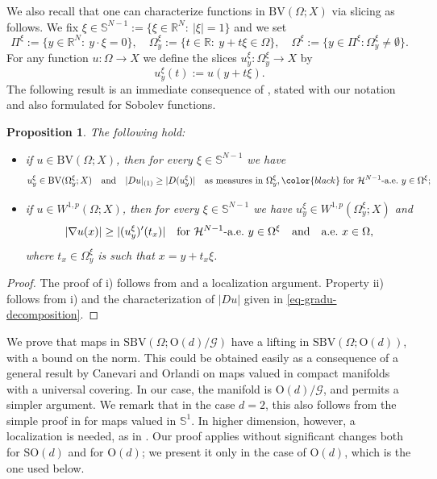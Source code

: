 \documentclass[a4paper,reqno]{amsart}
\newcommand\R{\mathbb{R}}
\newcommand{\BV}{\mathrm{BV}}
\newcommand{\SBV}{\mathrm{SBV}}
\newcommand\calH{\mathcal{H}}
\newtheorem{proposition}[definition]{Proposition}
\theoremstyle{remark}
\newcommand{\EEE}{\color{black}}
\newcommand{\G}{\mathcal{G}}
\newcommand{\SOn}{\mathrm{SO}(d)}
\newcommand{\On}{\mathrm{O}(d)}
\newcommand{\OnG}{{\On}/{\G}}
\newcommand{\xy}{^\xi_y}
\newcommand{\hN}{\calH^{N-1}}
\newcommand{\SN}{\mathbb{S}^{N-1}}
\numberwithin{equation}{section}
\begin{document}
We also recall that one can characterize functions in $\BV(\Omega;X)$ via slicing as follows.
We fix $\xi\in \SN:= \{ \xi\in\R^N\colon\ |\xi|=1\}$ and we set
\[
\Pi^\xi:=\{y\in\R^N\colon\ y\cdot \xi=0\}, \quad 
\Omega_y^\xi:=\{t\in\R\colon\ y+t\xi \in\Omega\}, \quad
\Omega^\xi:=\{y\in\Pi^\xi \colon \Omega_y^\xi \neq \emptyset\}.
\]
For any function $u\colon \Omega \to X$ we define  the slices $u_y^\xi\colon \Omega_y^\xi\to X$ by
$$
u_y^\xi(t):=u(y+t\xi).
$$
 The following result is an immediate consequence of \cite[Proposition 2.1]{Amb90SBVX}, stated with our notation and also formulated for Sobolev functions.


\begin{proposition}
	\label{prop-slicing}
The following hold:
	\begin{itemize}
		\item[i)] if $u\in \BV(\Omega;X)$, then for every $\xi\in \SN$ we have
\begin{equation}\label{3004251203}
		u_y^\xi\in \BV(\Omega_y^\xi; X)\quad \hbox{and} \quad 	|D u|_{(1)}\geq |D(u\xy)| \quad  \text{as measures in }\Omega\xy, \EEE \text{ for }\hN\text{-a.e.\ }y\in \Omega^\xi;
	\end{equation}
\item[ii)]	if $u\in W^{1,p}(\Omega; X)$, then for every $\xi\in \SN$ we have $u_y^\xi\in W^{1,p}(\Omega_y^\xi; X)$ and
$$
|\nabla u (x)|\geq |(u\xy)'(t_x)| \quad\text{for }\hN\text{-a.e.\ }y\in \Omega^\xi\quad \hbox{and} \quad \text{a.e.\ }x\in \Omega,
$$
where $t_x \in \Omega\xy$ is such that $x=y+t_x \xi$.
		\end{itemize}
\end{proposition}

\begin{proof}
	The proof of i) follows from \cite[Proposition 2.1]{Amb90SBVX} and a localization argument.
	Property ii) follows from i) and the characterization of $|Du|$ given in \eqref{eq-gradu-decomposition}.
\end{proof}

We prove
that maps in $\SBV(\Omega;\OnG)$ have a lifting in $\SBV(\Omega;\On)$, with a bound on the norm. This
could be obtained easily as a consequence of
 a general result by
Canevari and Orlandi \cite{CanOrl20JFA}
on maps valued in compact manifolds with a universal covering.
In our case, the manifold is $\OnG$, and permits a simpler argument.
We remark that in the case $d=2$, this also follows from the simple proof in \cite{DavilaIgnat2003lifting} for maps valued in $\mathbb{S}^1$. In higher dimension, however, a localization is needed, as in \cite{CanOrl20JFA}.
Our proof applies without significant changes both for $\SOn$ and for $\On$;
we present it only in the case of $\On$, which is the one used below.
\end{document}
